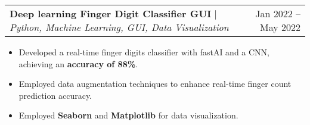 \documentclass[A4,10pt]{article}
\makeatletter
\newcommand{\resumeItem}[1]{
  \item\small{
    {#1 \vspace{-2pt}}
  }
}
\newcommand{\resumeProjectHeading}[2]{
    \item
    \begin{tabular*}{0.97\textwidth}{l@{\extracolsep{\fill}}r}
      \small#1 & #2 \\
    \end{tabular*}\vspace{-7pt}
}
\newcommand{\resumeItemListStart}{\begin{itemize}}
\newcommand{\resumeItemListEnd}{\end{itemize}\vspace{-5pt}}
\makeatother
\begin{document}

        
        \resumeProjectHeading
        {\textbf{Deep learning Finger Digit Classifier GUI} $|$ \emph{Python, Machine Learning, GUI, Data Visualization}}{Jan 2022 -- May 2022}
        \resumeItemListStart
          \resumeItem{Developed a real-time finger digits classifier with fastAI and a CNN, achieving an \textbf{accuracy of 88\%}.}
          \resumeItem{Employed data augmentation techniques to enhance real-time finger count prediction accuracy.}
          \resumeItem{Employed \textbf{Seaborn} and \textbf{Matplotlib} for data visualization.}
        \resumeItemListEnd
\end{document}
